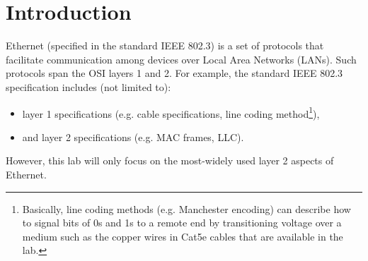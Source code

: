\documentclass[pdftex,12pt,a4paper]{article}
\begin{document}
    \section{Introduction}
        Ethernet (specified in the standard IEEE 802.3) is a set of protocols
        that facilitate communication among devices over Local Area Networks
        (LANs).  Such protocols span the OSI layers 1 and 2. For example, the
        standard IEEE 802.3 specification includes (not limited to):
        \begin{itemize}
            \item layer 1 specifications (e.g. cable specifications, line
            coding method\footnote{Basically, line coding methods (e.g.
            Manchester encoding) can describe how to signal bits of 0s and 1s
            to a remote end by transitioning voltage over a medium such as the
            copper wires in Cat5e cables that are available in the lab.}),
            \item and layer 2 specifications (e.g. MAC frames, LLC).
        \end{itemize}
        
        However, this lab will only focus on the most-widely used layer 2
        aspects of Ethernet.
\end{document}
